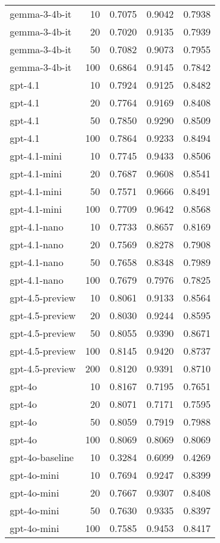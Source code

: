 \begin{tabular}{lrrrr}
gemma-3-4b-it & 10 & 0.7075 & 0.9042 & 0.7938 \\
gemma-3-4b-it & 20 & 0.7020 & 0.9135 & 0.7939 \\
gemma-3-4b-it & 50 & 0.7082 & 0.9073 & 0.7955 \\
gemma-3-4b-it & 100 & 0.6864 & 0.9145 & 0.7842 \\
gpt-4.1 & 10 & 0.7924 & 0.9125 & 0.8482 \\
gpt-4.1 & 20 & 0.7764 & 0.9169 & 0.8408 \\
gpt-4.1 & 50 & 0.7850 & 0.9290 & 0.8509 \\
gpt-4.1 & 100 & 0.7864 & 0.9233 & 0.8494 \\
gpt-4.1-mini & 10 & 0.7745 & 0.9433 & 0.8506 \\
gpt-4.1-mini & 20 & 0.7687 & 0.9608 & 0.8541 \\
gpt-4.1-mini & 50 & 0.7571 & 0.9666 & 0.8491 \\
gpt-4.1-mini & 100 & 0.7709 & 0.9642 & 0.8568 \\
gpt-4.1-nano & 10 & 0.7733 & 0.8657 & 0.8169 \\
gpt-4.1-nano & 20 & 0.7569 & 0.8278 & 0.7908 \\
gpt-4.1-nano & 50 & 0.7658 & 0.8348 & 0.7989 \\
gpt-4.1-nano & 100 & 0.7679 & 0.7976 & 0.7825 \\
gpt-4.5-preview & 10 & 0.8061 & 0.9133 & 0.8564 \\
gpt-4.5-preview & 20 & 0.8030 & 0.9244 & 0.8595 \\
gpt-4.5-preview & 50 & 0.8055 & 0.9390 & 0.8671 \\
gpt-4.5-preview & 100 & 0.8145 & 0.9420 & 0.8737 \\
gpt-4.5-preview & 200 & 0.8120 & 0.9391 & 0.8710 \\
gpt-4o & 10 & 0.8167 & 0.7195 & 0.7651 \\
gpt-4o & 20 & 0.8071 & 0.7171 & 0.7595 \\
gpt-4o & 50 & 0.8059 & 0.7919 & 0.7988 \\
gpt-4o & 100 & 0.8069 & 0.8069 & 0.8069 \\
gpt-4o-baseline & 10 & 0.3284 & 0.6099 & 0.4269 \\
gpt-4o-mini & 10 & 0.7694 & 0.9247 & 0.8399 \\
gpt-4o-mini & 20 & 0.7667 & 0.9307 & 0.8408 \\
gpt-4o-mini & 50 & 0.7630 & 0.9335 & 0.8397 \\
gpt-4o-mini & 100 & 0.7585 & 0.9453 & 0.8417 \\

\end{tabular}

